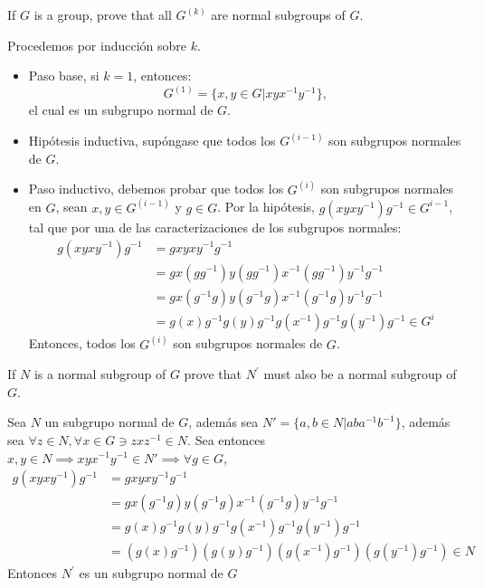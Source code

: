 \begin{problema}[Problema 4]
    If $G$ is a group, prove that all $G^{(k)}$ are normal subgroups of $G$.
    \begin{dem}
        Procedemos por inducción sobre $k$. 
        \begin{itemize}
            \item Paso base, si $k=1$, entonces: 
            $$G^{(1)}=\{x,y\in G|xyx^{-1}y^{-1}\},$$
            el cual es un subgrupo normal de $G$.
            \item Hipótesis inductiva, supóngase que todos los $G^{(i-1)}$ son subgrupos normales de $G$. 
            \item Paso inductivo, debemos probar que  todos los $G^{(i)}$ son subgrupos normales en $G$, sean $x,y\in G^{(i-1)}$ y $g\in G$. Por la hipótesis, $g(xyxy^{-1})g^{-1}\in G^{i-1}$, tal que por una de las caracterizaciones de los subgrupos normales:
            \begin{align*}
                g(xyxy^{-1})g^{-1} &= gxyxy^{-1}g^{-1}\\
                                         &= gx(gg^{-1})y(gg^{-1})x^{-1}(gg^{-1})y^{-1}g^{-1}\\
                                         &= gx(g^{-1}g)y(g^{-1}g)x^{-1}(g^{-1}g)y^{-1}g^{-1}\\
                                         &= g(x)g^{-1}g(y)g^{-1}g(x^{-1})g^{-1}g(y^{-1})g^{-1}\in G^{i}
            \end{align*}
            Entonces, todos los $G^{(i)}$ son subgrupos normales de $G$. 
        \end{itemize}
    \end{dem}
\end{problema}

\begin{problema}[Problema 5]
    If $N$ is a normal subgroup of $G$ prove that $N^{\prime}$ must also be a normal subgroup of $G$.
    \begin{dem}
        Sea $N$ un subgrupo normal de $G$, además sea $N'=\{a,b\in N|aba^{-1}b^{-1}\}$, además sea $\forall z\in N,\forall x\in G \ni zxz^{-1}\in N$. Sea entonces $x,y\in N\implies xyx^{-1}y^{-1}\in N'\implies \forall g\in G$, 
        \begin{align*}
            g(xyxy^{-1})g^{-1} &= gxyxy^{-1}g^{-1}\\
                                     &= gx(g^{-1}g)y(g^{-1}g)x^{-1}(g^{-1}g)y^{-1}g^{-1}\\
                                     &= g(x)g^{-1}g(y)g^{-1}g(x^{-1})g^{-1}g(y^{-1})g^{-1}\\
                                     &= (g(x)g^{-1})(g(y)g^{-1})(g(x^{-1})g^{-1})(g(y^{-1})g^{-1})\in N
        \end{align*}
        Entonces $N^{\prime}$ es un subgrupo normal de $G$
    \end{dem}
\end{problema}




%
%

